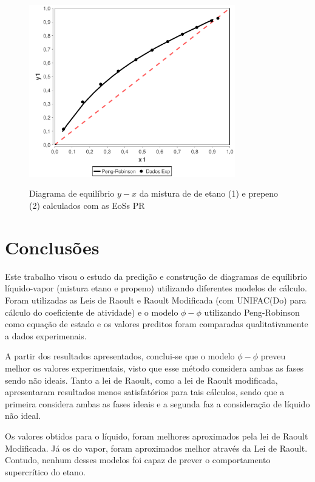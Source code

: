 \begin{figure}
\centering
{\includegraphics[width=0.8\textwidth]{img/VLE-Ethane(1)Propylene(2)-x1&y1-PengRobinson.pdf}}
\caption{Diagrama de equilíbrio $y-x$ da mistura de de etano (1) e
prepeno (2) calculados com as EoSs PR}
\label{fig:phi02}
\end{figure}
\clearpage

\section{Conclusões}

Este trabalho visou o estudo da predição e construção de diagramas de equílibrio
líquido-vapor (mistura etano e propeno) utilizando diferentes modelos de
cálculo. Foram utilizadas as Leis de Raoult e Raoult Modificada (com UNIFAC(Do)
para cálculo do coeficiente de atividade) e o modelo $\phi-\phi$ utilizando Peng-Robinson como equação de
estado e os valores preditos foram comparadas qualitativamente a dados
experimenais.

A partir dos resultados apresentados, conclui-se que o modelo $\phi-\phi$
preveu melhor os valores experimentais, visto que esse método considera ambas as
fases sendo não ideais. Tanto a lei de Raoult, como a lei de Raoult modificada,
apresentaram resultados menos satisfatórios para tais cálculos, sendo que a
primeira considera ambas as fases ideais e a segunda faz a consideração de
líquido não ideal. 

Os valores obtidos para o líquido, foram melhores aproximados pela lei de
Raoult Modificada. Já os do vapor, foram aproximados melhor através da Lei de Raoult.
Contudo, nenhum desses modelos foi capaz de prever o
comportamento supercrítico do etano.


